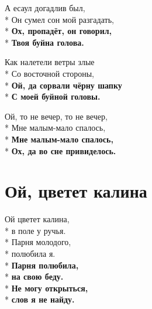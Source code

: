 \medskip

\begin{minipage}{\linewidth}
А есаул догадлив был,\\*
Он сумел сон мой разгадать,\\*
\textbf{Ох, пропадёт, он говорил,}\\*
\textbf{Твоя буйна голова.}\\
\end{minipage}\par\medskip\nobreak

\medskip

\begin{minipage}{\linewidth}
Как налетели ветры злые\\*
Со восточной стороны,\\*
\textbf{Ой, да сорвали чёрну шапку}\\*
\textbf{С моей буйной головы.}\\
\end{minipage}\par\medskip\nobreak

\medskip

\begin{minipage}{\linewidth}
Ой, то не вечер, то не вечер,\\*
Мне малым-мало спалось,\\*
\textbf{Мне малым-мало спалось,}\\*
\textbf{Ох, да во сне привиделось.}\\
\end{minipage}

\vspace{\fill}\newpage

\section{Ой, цветет калина}
\label{song:Ой,_цветет_калина}

\medskip

\begin{minipage}{\linewidth}
Ой цветет калина,\\*
в поле у ручья.\\*
Парня молодого,\\*
полюбила я.\\*
\textbf{Парня полюбила,}\\*
\textbf{на свою беду.}\\*
\textbf{Не могу открыться,}\\*
\textbf{слов я не найду.}\\
\end{minipage}\par\medskip\nobreak

